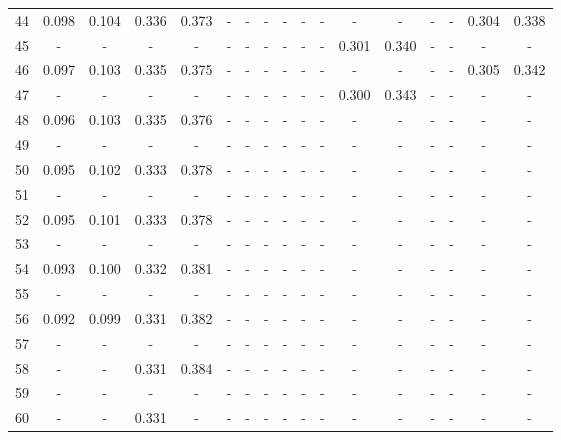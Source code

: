 \documentclass{report}
\begin{document}
\begin{appendices}
\begin{sidewaystable}
\begin{tabular}{|c|cccc|cccc|cccc|cccc|}
44 & 0.098 & 0.104 & 0.336 & 0.373 &   -   &   -   &   -   &   -   &   -   &   -   &   -   &   -   &   -   &   -   & 0.304 & 0.338\\
45 &   -   &   -   &   -   &   -   &   -   &   -   &   -   &   -   &   -   &   -   & 0.301 & 0.340 &   -   &   -   &   -   &   -  \\
46 & 0.097 & 0.103 & 0.335 & 0.375 &   -   &   -   &   -   &   -   &   -   &   -   &   -   &   -   &   -   &   -   & 0.305 & 0.342\\
47 &   -   &   -   &   -   &   -   &   -   &   -   &   -   &   -   &   -   &   -   & 0.300 & 0.343 &   -   &   -   &   -   &   -  \\
48 & 0.096 & 0.103 & 0.335 & 0.376 &   -   &   -   &   -   &   -   &   -   &   -   &   -   &   -   &   -   &   -   &   -   &   -  \\
49 &   -   &   -   &   -   &   -   &   -   &   -   &   -   &   -   &   -   &   -   &   -   &   -   &   -   &   -   &   -   &   -  \\
50 & 0.095 & 0.102 & 0.333 & 0.378 &   -   &   -   &   -   &   -   &   -   &   -   &   -   &   -   &   -   &   -   &   -   &   -  \\
51 &   -   &   -   &   -   &   -   &   -   &   -   &   -   &   -   &   -   &   -   &   -   &   -   &   -   &   -   &   -   &   -  \\
52 & 0.095 & 0.101 & 0.333 & 0.378 &   -   &   -   &   -   &   -   &   -   &   -   &   -   &   -   &   -   &   -   &   -   &   -  \\
53 &   -   &   -   &   -   &   -   &   -   &   -   &   -   &   -   &   -   &   -   &   -   &   -   &   -   &   -   &   -   &   -  \\
54 & 0.093 & 0.100 & 0.332 & 0.381 &   -   &   -   &   -   &   -   &   -   &   -   &   -   &   -   &   -   &   -   &   -   &   -  \\
55 &   -   &   -   &   -   &   -   &   -   &   -   &   -   &   -   &   -   &   -   &   -   &   -   &   -   &   -   &   -   &   -  \\
56 & 0.092 & 0.099 & 0.331 & 0.382 &   -   &   -   &   -   &   -   &   -   &   -   &   -   &   -   &   -   &   -   &   -   &   -  \\
57 &   -   &   -   &   -   &   -   &   -   &   -   &   -   &   -   &   -   &   -   &   -   &   -   &   -   &   -   &   -   &   -  \\
58 &   -   &   -   & 0.331 & 0.384 &   -   &   -   &   -   &   -   &   -   &   -   &   -   &   -   &   -   &   -   &   -   &   -  \\
59 &   -   &   -   &   -   &   -   &   -   &   -   &   -   &   -   &   -   &   -   &   -   &   -   &   -   &   -   &   -   &   -  \\
60 &   -   &   -   & 0.331 &   -   &   -   &   -   &   -   &   -   &   -   &   -   &   -   &   -   &   -   &   -   &   -   &   -  \\
\hline
\end{tabular}
\end{sidewaystable}


\end{appendices}
\end{document}
